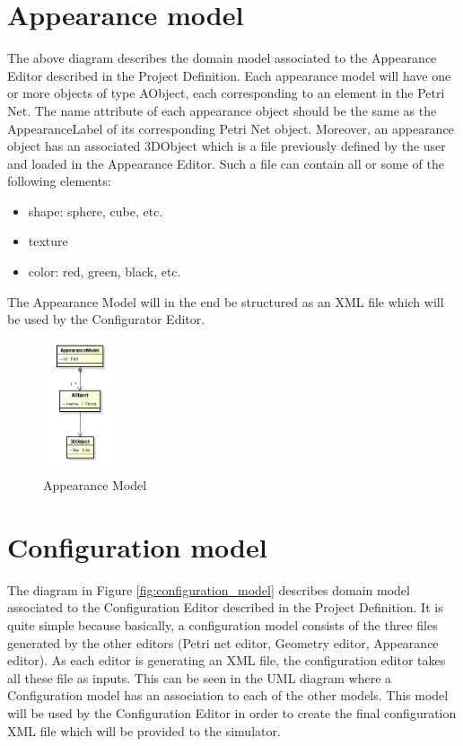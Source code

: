 \documentclass[11pt]{article}   %
\begin{document}
\newpage
\section{Appearance model}

The above diagram describes the domain model associated to the Appearance Editor described in the Project Definition. 
Each appearance model will have one or more objects of type AObject, each corresponding to an element in the Petri Net. The name attribute of each appearance object should be the same as the AppearanceLabel of its corresponding Petri Net object. Moreover, an appearance object has an associated 3DObject which is a file previously defined by the user and loaded in the Appearance Editor. Such a file can contain all or some of the following elements: 
\begin{itemize}
\item shape: sphere, cube, etc.
\item texture
\item color: red, green, black, etc.
\end{itemize}

The Appearance Model will in the end be structured as an XML file which will be used by the Configurator Editor.    

\begin{figure}[htp]
\begin{center}
  \includegraphics[width=0.2\textwidth]{image/appearance_model.png}
  \caption{Appearance Model}
  \label{fig:appearance_model}
\end{center}
\end{figure}

\newpage
\section{Configuration model}

The diagram in Figure \ref{fig:configuration_model} describes domain model associated to the Configuration Editor described in the Project Definition. It is quite simple because basically, a configuration model consists of the three files generated by the other editors (Petri net editor, Geometry editor, Appearance editor).
As each editor is generating an XML file, the configuration editor takes all these file as inputs. This can be seen in the UML diagram where a Configuration model has an association to each of the other models.
This model will be used by the Configuration Editor in order to create the final configuration XML file which will be provided to the simulator.
\end{document}
